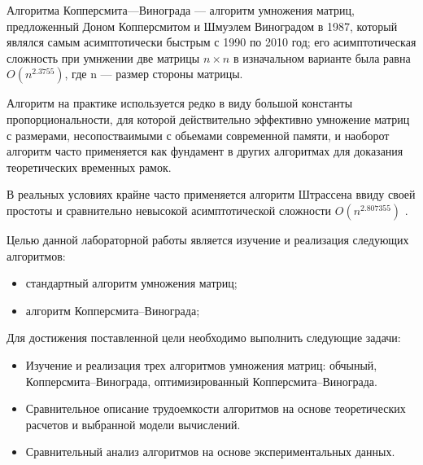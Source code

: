 \tableofcontents{}

\Introduction

Алгоритма Копперсмита---Винограда --- алгоритм умножения матриц, предложенный Доном Копперсмитом и Шмуэлем Виноградом в 1987, который являлся самым асимптотически быстрым с 1990 по 2010 год; его асимптотическая сложность при умнжении две матрицы $n \times n$ в изначальном варианте была равна $O(n^{2.3755})$, где n --- размер стороны матрицы.



Алгоритм на практике используется редко в виду большой константы пропорциональности, для которой действительно эффективно умножение матриц с размерами, несопостваимыми с обьемами современной памяти, и наоборот алгоритм часто применяется как фундамент в других алгоритмах для доказания теоретических временных рамок. 

В реальных условиях крайне часто применяется алгоритм Штрассена ввиду своей простоты и сравнительно невысокой асимптотической сложности $O(n ^{2.807355})$ \cite{stothers2010complexity_abstract}. 

Целью данной лабораторной работы является изучение и реализация следующих алгоритмов: 
\begin{itemize}
    \item стандартный алгоритм умножения матриц;
    \item алгоритм Копперсмита--Винограда;
\end{itemize}



Для достижения поставленной цели необходимо выполнить следующие задачи:
\begin{itemize}
    \item Изучение и реализация трех алгоритмов умножения матриц: обчыный, Копперсмита--Винограда, оптимизированный Копперсмита--Винограда.
    \item Сравнительное описание трудоемкости алгоритмов на основе теоретических расчетов и выбранной модели вычислений.
    \item Сравнительный анализ алгоритмов на основе экспериментальных данных.
\end{itemize}